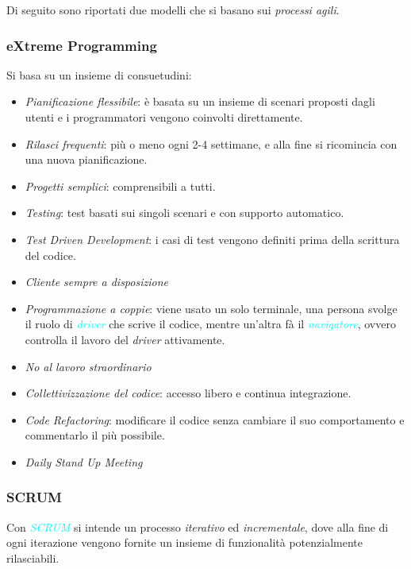 Di seguito sono riportati due modelli che si basano sui \emph{processi agili}.

\subsubsection{eXtreme Programming}

Si basa su un insieme di consuetudini:

\begin{itemize}
    \item \emph{Pianificazione flessibile}: è basata su un insieme di scenari proposti dagli utenti e i programmatori vengono coinvolti direttamente.
    \item \emph{Rilasci frequenti}: più o meno ogni 2-4 settimane, e alla fine si ricomincia con una nuova pianificazione.
    \item \emph{Progetti semplici}: comprensibili a tutti.
    \item \emph{Testing}: test basati sui singoli scenari e con supporto automatico.
    \item \emph{Test Driven Development}: i casi di test vengono definiti prima della scrittura del codice.
    \item \emph{Cliente sempre a disposizione}
    \item \emph{Programmazione a coppie}: viene usato un solo terminale, una persona svolge il ruolo di \emph{\textcolor{cyan}{driver}}
        che scrive il codice, mentre un'altra fà il \emph{\textcolor{cyan}{navigatore}}, ovvero controlla il lavoro del \emph{driver} attivamente.
    \item \emph{No al lavoro straordinario}
    \item \emph{Collettivizzazione del codice}: accesso libero e continua integrazione.
    \item \emph{Code Refactoring}: modificare il codice senza cambiare il suo comportamento e commentarlo il più possibile.
    \item \emph{Daily Stand Up Meeting}
\end{itemize}

\subsubsection{SCRUM}

\begin{definition}[SCRUM]
    Con \emph{\textcolor{cyan}{SCRUM}} si intende un processo \emph{iterativo} ed \emph{incrementale}, dove alla fine
    di ogni iterazione vengono fornite un insieme di funzionalità potenzialmente rilasciabili.
\end{definition}

